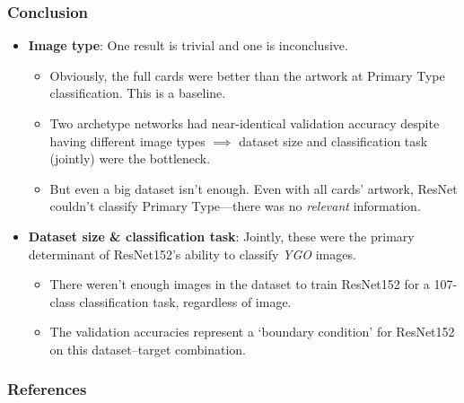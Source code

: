 \documentclass[11pt]{beamer}
\begin{document}
%
%

\begin{frame}
	\frametitle{Conclusion}
	\pause
	\begin{itemize}
	\item \textbf{Image type}: One result is trivial and one is inconclusive.
		\begin{itemize}
	\pause
		\item Obviously, the full cards were better than the artwork at Primary Type classification. This is a baseline.
	\pause
		\item Two archetype networks had near-identical validation accuracy despite having different image types $\implies$ dataset size and classification task (jointly) were the bottleneck.
	\pause
		\item But even a big dataset isn't enough. Even with all cards' artwork, ResNet couldn't classify Primary Type---there was no \textit{relevant} information.
		\end{itemize}
	\pause
	\item \textbf{Dataset size \& classification task}: Jointly, these were the primary determinant of ResNet152's ability to classify \textit{YGO} images.
		\begin{itemize}
		\item There weren't enough images in the dataset to train ResNet152 for a 107-class classification task, regardless of image.
		\item The validation accuracies represent a `boundary condition' for ResNet152 on this dataset--target combination.
		\end{itemize}
	\end{itemize}

\end{frame}

%
%

\begin{frame}[allowframebreaks]
	\frametitle{References}
	\footnotesize
	
\end{frame}
\end{document}
